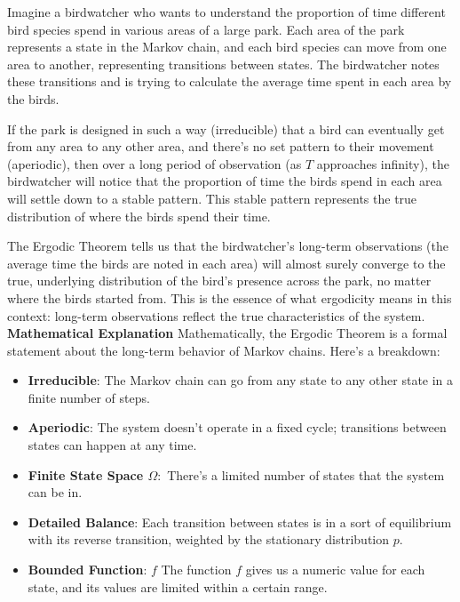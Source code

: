 \documentclass{article}
\begin{document}
Imagine a birdwatcher who wants to understand the proportion of time different bird species spend in various areas of a large park. Each area of the park represents a state in the Markov chain, and each bird species can move from one area to another, representing transitions between states. The birdwatcher notes these transitions and is trying to calculate the average time spent in each area by the birds.

If the park is designed in such a way (irreducible) that a bird can eventually get from any area to any other area, and there's no set pattern to their movement (aperiodic), then over a long period of observation (as \( T \) approaches infinity), the birdwatcher will notice that the proportion of time the birds spend in each area will settle down to a stable pattern. This stable pattern represents the true distribution of where the birds spend their time.

The Ergodic Theorem tells us that the birdwatcher's long-term observations (the average time the birds are noted in each area) will almost surely converge to the true, underlying distribution of the bird's presence across the park, no matter where the birds started from. This is the essence of what ergodicity means in this context: long-term observations reflect the true characteristics of the system.
\newline
\textbf{Mathematical Explanation}
\newline
Mathematically, the Ergodic Theorem is a formal statement about the long-term behavior of Markov chains. Here's a breakdown:
\begin{itemize}
    \item \textbf{Irreducible}: The Markov chain can go from any state to any other state in a finite number of steps.
    \item \textbf{Aperiodic}: The system doesn't operate in a fixed cycle; transitions between states can happen at any time.
    \item \textbf{Finite State Space \( \Omega :\)} There's a limited number of states that the system can be in.
    \item \textbf{Detailed Balance}: Each transition between states is in a sort of equilibrium with its reverse transition, weighted by the stationary distribution \( p \).
    \item \textbf{Bounded Function}: \( f \) The function \( f \) gives us a numeric value for each state, and its values are limited within a certain range.
\end{itemize}
\end{document}

